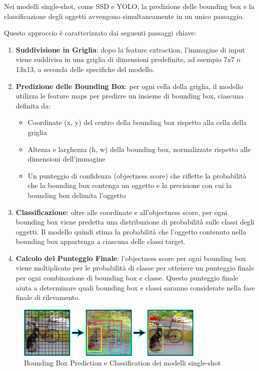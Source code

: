 Nei modelli single-shot, come SSD e YOLO, la predizione delle bounding box e la classificazione degli oggetti avvengono simultaneamente in un unico passaggio.

Questo approccio è caratterizzato dai seguenti passaggi chiave:
\begin{enumerate}
  \item \textbf{Suddivisione in Griglia}: dopo la feature extraction, l'immagine di input viene suddivisa in una griglia di dimensioni predefinite, ad esempio 7x7 o 13x13, a seconda delle specifiche del modello.
  \item \textbf{Predizione delle Bounding Box}: per ogni cella della griglia, il modello utilizza le feature maps per predirre un insieme di bounding box, ciascuna definita da:
  \begin{itemize}
    \item Coordinate (x, y) del centro della bounding box rispetto alla cella della griglia
    \item Altezza e larghezza (h, w) della bounding box, normalizzate rispetto alle dimensioni dell'immagine
    \item Un punteggio di confidenza (objectness score) che riflette la probabilità che la bounding box contenga un oggetto e la precisione con cui la bounding box delimita l'oggetto
  \end{itemize}
  \item \textbf{Classificazione}: oltre alle coordinate e all'objectness score, per ogni bounding box viene predetta una distribuzione di probabilità sulle classi degli oggetti. Il modello quindi stima la probabilità che l'oggetto contenuto nella bounding box appartenga a ciascuna delle classi target.
  \item \textbf{Calcolo del Punteggio Finale}: l'objectness score per ogni bounding box viene moltiplicato per le probabilità di classe per ottenere un punteggio finale per ogni combinazione di bounding box e classe. Questo punteggio finale aiuta a determinare quali bounding box e classi saranno considerate nella fase finale di rilevamento.
\end{enumerate}

\begin{figure}[ht]
    \centering
    \includegraphics[width=0.8\textwidth]{files/capitoli/1-object-detection/assets/single-shot-grid.png}
    \caption{\label{fig:single-shot-grid}Bounding Box Prediction e Classification dei modelli single-shot\cite{5}}
\end{figure}



